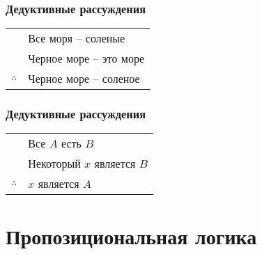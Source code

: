 \documentclass[24pt,pdf,hyperref={unicode}]{beamer}
\begin{document}
\begin{frame}\frametitle{Дедуктивные рассуждения}
\begin{tabular}{l l}
 & Все моря -- соленые \\
 & Черное море -- это море \\
 \hline
$\therefore$ & Черное море -- соленое \\
\end{tabular}
\end{frame}

\begin{frame}\frametitle{Дедуктивные рассуждения}
\begin{tabular}{l l}
 & Все $A$ есть $B$\\
 & Некоторый $x$ является $B$\\
 \hline
$\therefore$ & $x$ является $A$ \\
\end{tabular}
\end{frame}

\section{Пропозициональная логика}
\end{document}
